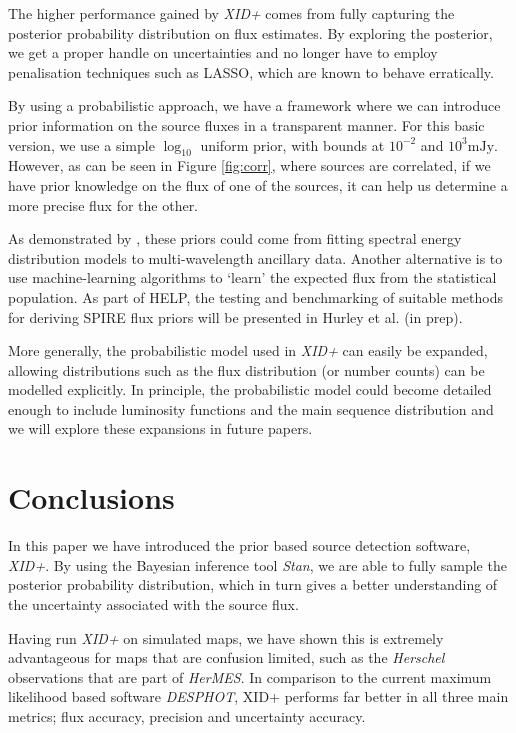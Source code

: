 \documentclass[useAMS,usenatbib]{mnras}
\begin{document}
The higher performance gained by \emph{XID+} comes from fully capturing the posterior probability distribution on flux estimates. By exploring the posterior, we get a proper handle on uncertainties and no longer have to employ penalisation techniques such as LASSO, which are known to behave erratically.

By using a probabilistic approach, we have a framework where we can introduce prior information on the source fluxes in a transparent manner. For this basic version, we use a simple $\log_{10}$ uniform prior, with bounds at $10^{-2}$ and $10^{3}\mathrm{mJy}$. However, as can be seen in Figure \ref{fig:corr}, where sources are correlated, if we have prior knowledge on the flux of one of the sources, it can help us determine a more precise flux for the other.

As demonstrated by \cite{Safarzadeh:2015}, these priors could come from fitting spectral energy distribution models to multi-wavelength ancillary data. Another alternative is to use machine-learning algorithms to `learn' the expected flux from the statistical population. As part of HELP, the testing and benchmarking of suitable methods for deriving SPIRE flux priors will be presented in Hurley et al. (in prep). 

More generally, the probabilistic model used in \emph{XID+} can easily be expanded, allowing distributions such as the flux distribution (or number counts) can be modelled explicitly. In principle, the probabilistic model could become detailed enough to include luminosity functions and the main sequence distribution and we will explore these expansions in future papers.

\section{Conclusions}\label{sec:conc}
In this paper we have introduced the prior based source detection software, \emph{XID+}. By using the Bayesian inference tool \emph{Stan}, we are able to fully sample the posterior probability distribution, which in turn gives a better understanding of the uncertainty associated with the source flux. 

Having run \emph{XID+} on simulated maps, we have shown this is extremely advantageous for maps that are confusion limited, such as the \emph{Herschel} observations that are part of \emph{HerMES}. In comparison to the current maximum likelihood based software \emph{DESPHOT}, XID+ performs far better in all three main metrics; flux accuracy, precision and uncertainty accuracy.
\end{document}
